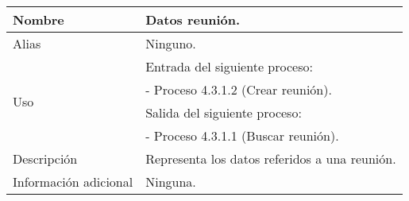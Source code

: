 \begin{center}
  \begin{tabular}{| l | p{9cm} |}
    \hline
    Nombre & \textbf{Datos reunión}.\\
    \hline
    Alias & Ninguno.\\
    \hline
    \multirow{4}{*}{Uso} & Entrada del siguiente proceso:\\
                         & - Proceso 4.3.1.2 (Crear reunión).\\
                         & Salida del siguiente proceso:\\
                         & - Proceso 4.3.1.1 (Buscar reunión).\\
    \hline
    Descripción & Representa los datos referidos a una reunión.\\
    \hline
    Información adicional & Ninguna.\\
    \hline
  \end{tabular}
\end{center}
